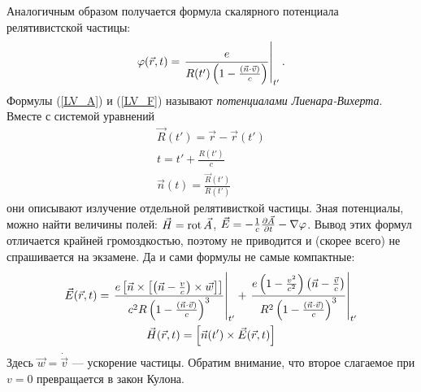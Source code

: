     Аналогичным образом получается формула скалярного потенциала релятивистской частицы:
    \begin{equation}
        \varphi(\vec{r}, t) = \left. \frac{e}{R(t')\left({1 - \frac{\left({\vec{n}\cdot\vec{v}}\right)}{c}}\right)} \right|_{t'}. \label{LV_F}
    \end{equation}
    Формулы (\ref{LV_A}) и (\ref{LV_F}) называют \textit{потенциалами Лиенара-Вихерта}. Вместе с системой уравнений
    \begin{gather*}
        \vec{R}(t') = \vec{r} - \vec{r}(t')\\
        t = t' + \frac{R(t')}{c}\\
        \vec{n}(t) = \frac{\vec{R}(t')}{R(t')}
    \end{gather*}
    они описывают излучение отдельной релятивисткой частицы. Зная потенциалы, можно найти величины полей: $\vec{H} = \operatorname{rot}\vec{A}$, $\vec{E} = -\frac 1c \frac{\partial\vec{A}}{\partial t} - \nabla\varphi$.
    Вывод этих формул отличается крайней громоздкостью, поэтому не приводится и (скорее всего) не спрашивается на экзамене. Да и сами формулы не самые компактные:
    \begin{gather*}
        \vec{E}(\vec{r}, t) = \left. \frac{e\left[{\vec{n} \times \left[{\left({\vec{n} - \frac{v}{c}}\right) \times \vec{w}}\right]}\right]}{c^2R\left({1 - \frac{\left({\vec{n}\cdot\vec{v}}\right)}{c}}\right)^3} \right|_{t'} +
        \left. \frac{e \left({1 - \frac{v^2}{c^2}}\right) \left({\vec{n} - \frac{\vec{v}}{c}}\right)}{R^2 \left({1 - \frac{\left({\vec{n}\cdot\vec{v}}\right)}{c}}\right)^3} \right|_{t'} \\
        \vec{H}(\vec{r}, t) = \left[{\vec n(t')\times\vec E(\vec{r}, t)}\right]
    \end{gather*}
    Здесь $\vec{w} = \dot{\vec{v}}$ --- ускорение частицы. Обратим внимание, что второе слагаемое при $v = 0$ превращается в закон Кулона.

